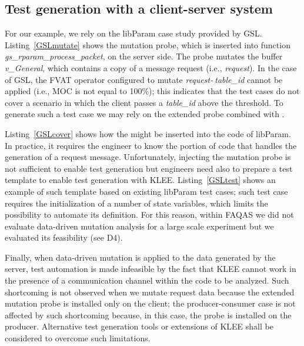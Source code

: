 \clearpage
\subsection{Test generation with a client-server system}

\STARTCHANGEDWPT

For our example, we rely on the libParam case study provided by GSL. Listing~\ref{GSLmutate} shows the mutation probe, which is inserted into function \emph{gs\_rparam\_process\_packet}, on the server side. The probe mutates the buffer \emph{v\_General}, which contains a copy of a message request (i.e., \emph{request}). In the case of GSL, the FVAT operator configured to mutate \emph{request-$\>$table\_id} cannot be applied (i.e., MOC is not equal to 100\%); this indicates that the test cases do not cover a scenario in which the client passes a \emph{table\_id} above the threshold. To generate such a test case we may rely on the extended probe combined with . 

Listing~\ref{GSLcover} shows how the  might be inserted into the code of libParam. In practice, it requires the engineer to know the portion of code that handles the generation of a request message. Unfortunately, injecting the mutation probe is not sufficient to enable test generation but engineers need also to prepare a test template to enable test generation with KLEE. Listing~\ref{GSLtest} shows an example of such template based on existing libParam test cases; such test case requires the initialization of a number of state variables, which limits the possibility to automate its definition. For this reason, within FAQAS we did not evaluate data-driven mutation analysis for a large scale experiment but we evaluated its feasibility (see D4).

Finally, when data-driven mutation is applied to the data generated by the server, test automation is made infeasible by the fact that KLEE cannot work in the presence of a communication channel within the code to be analyzed. Such shortcoming is not observed when we mutate request data because the extended mutation probe is installed only on the client; the producer-consumer case is not affected by such shortcoming because, in this case, the probe is installed on the producer. Alternative test generation tools or extensions of KLEE shall be considered to overcome such limitations.







\ENDCHANGEDWPT



